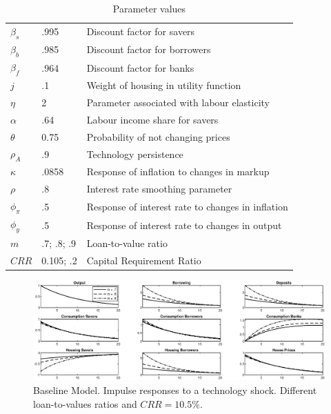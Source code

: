 \documentclass[final,3p,times,twocolumn]{elsarticle}
\begin{document}
 
\begin{table}[htbp]
\footnotesize
\caption{Parameter values} 
\label{tab:my-table}
\begin{tabular}{lll}
\hline
$\beta_s$ & .995       & Discount factor for savers                        \\
$\beta_b$ & .985       & Discount factor for borrowers                     \\
$\beta_f$ & .964       & Discount factor for banks                         \\
$j$       & .1         & Weight of housing in utility function             \\
$\eta$    & 2          & Parameter associated with labour elasticity       \\
$\alpha$  & .64        & Labour income share for savers                    \\
$\theta$  & 0.75       & Probability of not changing prices  \\
$\rho_A$  & .9         & Technology persistence                            \\
$\kappa$  & .0858      & Response of inflation to changes in markup        \\
$\rho$    & .8         & Interest rate smoothing parameter                 \\
$\phi_\pi$ & .5         & Response of interest rate to changes in inflation \\
$\phi_y$  & .5         & Response of interest rate to changes in output    \\
$m$       & .7; .8; .9 & Loan-to-value ratio                               \\
$CRR$     & 0.105; .2  & Capital Requirement Ratio                         \\
\hline
\end{tabular}
\end{table}
 
 
 \begin{figure}[ht]
\centering
  \includegraphics[width=\linewidth]{fig1_rbc_crr_105.eps}
  \caption{Baseline Model. Impulse responses to a technology shock. Different loan-to-values ratios and $CRR=10.5\%$.}
    \label{fig:fig1}
\end{figure}
\end{document}
